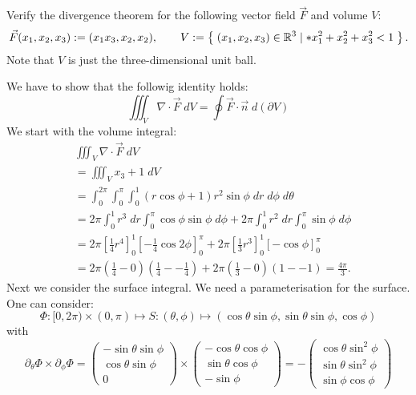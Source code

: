 \documentclass[11pt]{article}
\begin{document}
\begin{exercise}
    Verify the divergence theorem for the following vector field $\vec F$ and volume $V$:
    \begin{gather*}
        \vec F(x_1,x_2,x_3) := ( x_1 x_3, x_2, x_2 ),
        \qquad 
        V := \left\{\; (x_1,x_2,x_3) \in \mathbb R^3 \suchthat* x_1^2 + x_2^2 + x_3^2 < 1 \;\right\}
        .
    \end{gather*}
    Note that $V$ is just the three-dimensional unit ball. 
\end{exercise}
\begin{solution}    
    We have to show that the followig identity holds: 
    \[
    \iiint_{V}\nabla \cdot \vec{F}\;dV =  \oint \vec{F}\cdot \vec{n} \;d(\partial V)
    \] 
    We start with the volume integral:
    \begin{align*}
        &
        \iiint_{V}\nabla \cdot \vec{F}\;dV
        \\&
        =
        \iiint_{V}x_3 + 1\;dV
        \\&
        =
        \int_{0}^{2\pi}\int_0^{\pi}\int_0^ 1 (r\cos\phi + 1)r^ 2\sin\phi\;d r\;d\phi\;d\theta
        \\&
        =
        2\pi\int_0^1 r^3\;d r\int_0^{\pi}\cos\phi\sin\phi\;d \phi + 2\pi\int_0^1 r^2\;d r\int_0^{\pi}\sin\phi\;d \phi 
        \\&
        =
        2\pi\left[ \frac{1}{4}r^ 4 \right]_0^ {1} \left[-\frac{1}{4}\cos2\phi\right]_0^{\pi} + 2\pi\left[ \frac{1}{3}r^ 3 \right]_0^ {1} \left[-\cos\phi\right]_0^{\pi}
        \\&
        =
        2\pi\left(\frac{1}{4} - 0\right)\left(\frac{1}{4} - -\frac{1}{4}\right) + 2\pi\left(\frac{1}{3} - 0\right)\left(1 - - 1\right) = \frac{4\pi}{3}
        .
    \end{align*}
    Next we consider the surface integral. We need a parameterisation for the surface. One can consider:
    \[
    \Phi: [0,2\pi) \times (0,\pi) \mapsto S: (\theta,\phi)\mapsto (\cos\theta \sin\phi, \sin\theta\sin\phi,\cos\phi)
    \]
    with 
    \[
    \partial_{\theta}\Phi\times \partial_{\phi}\Phi  = \begin{pmatrix} -\sin\theta\sin\phi\\ \cos\theta\sin\phi \\0 \end{pmatrix} \times \begin{pmatrix} -\cos\theta\cos\phi\\ \sin\theta\cos\phi \\-\sin\phi \end{pmatrix} = -\begin{pmatrix} \cos\theta\sin^2\phi\\ \sin\theta\sin^2\phi \\\sin\phi\cos\phi \end{pmatrix} 
\]
\end{solution}
\end{document}
